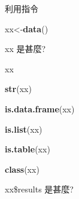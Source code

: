 \documentclass[]{book}
\newenvironment{Shaded}{\begin{snugshade}}{\end{snugshade}}
\newcommand{\KeywordTok}[1]{\textcolor[rgb]{0.13,0.29,0.53}{\textbf{#1}}}
\newcommand{\OperatorTok}[1]{\textcolor[rgb]{0.81,0.36,0.00}{\textbf{#1}}}
\newcommand{\NormalTok}[1]{#1}
\theoremstyle{definition}
\theoremstyle{definition}
\theoremstyle{definition}
\theoremstyle{remark}
\begin{document}
利用指令

\begin{Shaded}
\begin{Highlighting}[]
\NormalTok{xx<-}\KeywordTok{data}\NormalTok{()}
\end{Highlighting}
\end{Shaded}

xx 是甚麼?

\begin{Shaded}
\begin{Highlighting}[]
\NormalTok{xx}
\end{Highlighting}
\end{Shaded}

\begin{Shaded}
\begin{Highlighting}[]
\KeywordTok{str}\NormalTok{(xx)}
\end{Highlighting}
\end{Shaded}

\begin{Shaded}
\begin{Highlighting}[]
\KeywordTok{is.data.frame}\NormalTok{(xx)}
\end{Highlighting}
\end{Shaded}

\begin{Shaded}
\begin{Highlighting}[]
\KeywordTok{is.list}\NormalTok{(xx)}
\end{Highlighting}
\end{Shaded}

\begin{Shaded}
\begin{Highlighting}[]
\KeywordTok{is.table}\NormalTok{(xx)}
\end{Highlighting}
\end{Shaded}

\begin{Shaded}
\begin{Highlighting}[]
\KeywordTok{class}\NormalTok{(xx)}
\end{Highlighting}
\end{Shaded}

\begin{Shaded}
\end{Shaded}

xx\$results 是甚麼?
\end{document}
